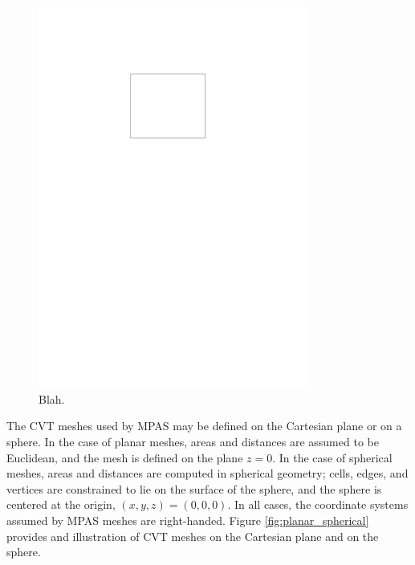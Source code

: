 \documentclass[11pt]{report}
\begin{document}
\begin{figure}[htb]
\begin{center}
\includegraphics[width=3.5in]{figures/blank_figure.pdf}
\caption{Blah.}
\label{fig:voronoi}
\end{center}
\end{figure}

The CVT meshes used by MPAS may be defined on the Cartesian plane or on a sphere. In the case of planar meshes, areas and distances are assumed to be Euclidean, and the mesh is defined on the plane $z=0$. In the case of spherical meshes, areas and distances are computed in spherical geometry; cells, edges, and vertices are constrained to lie on the surface of the sphere, and the sphere is centered at the origin, $(x,y,z)=(0,0,0)$. In all cases, the coordinate systems assumed by MPAS meshes are right-handed. Figure \ref{fig:planar_spherical} provides and illustration of CVT meshes on the Cartesian plane and on the sphere.
\end{document}
